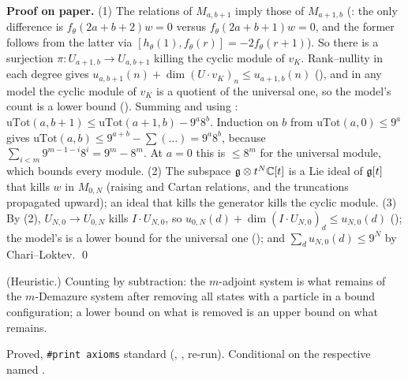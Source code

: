 \textbf{Proof on paper.} (1) The relations of $M_{a,b+1}$ imply those of $M_{a+1,b}$ (: the only
difference is $f_\theta(2a+b+2)w=0$ versus $f_\theta(2a+b+1)w=0$, and the former follows from the latter via
$[h_\theta(1),f_\theta(r)]=-2f_\theta(r+1)$). So there is a surjection $\pi:U_{a+1,b}\to U_{a,b+1}$ killing the cyclic module of
$v_K$. Rank--nullity in each degree gives $u_{a,b+1}(n)+\dim(U\cdot v_K)_n\le u_{a+1,b}(n)$ (), and in any
model the cyclic module of $v_K$ is a quotient of the universal one, so the model's count is a lower bound
(). Summing and using : $\mathrm{uTot}(a,b+1)\le\mathrm{uTot}(a+1,b)-9^a8^b$. Induction on $b$ from
$\mathrm{uTot}(a,0)\le9^a$ gives $\mathrm{uTot}(a,b)\le9^{a+b}-\sum(\dots)=9^a8^b$, because
$\sum_{i<m}9^{m-1-i}8^i=9^m-8^m$. At $a=0$ this is $\le8^m$ for the universal module, which bounds every module.
(2) The subspace $\mathfrak g\otimes t^N{\mathbb{C}}[t]$ is a Lie ideal of $\mathfrak g[t]$ that kills $w$ in $M_{0,N}$ (raising and
Cartan relations, and the truncations propagated upward); an ideal that kills the generator kills the cyclic module.
(3) By (2), $U_{N,0}\to U_{0,N}$ kills $I\cdot U_{N,0}$, so $u_{0,N}(d)+\dim(I\cdot U_{N,0})_d\le u_{N,0}(d)$
(); the model's  is a lower bound for the universal one (); and $\sum_du_{N,0}(d)\le9^N$
by Chari--Loktev. \qed

\begin{physics}
(Heuristic.) Counting by subtraction: the $m$-adjoint system is what remains of the $m$-Demazure system after removing all states with a
particle in a bound configuration; a lower bound on what is removed is an upper bound on what remains.
\end{physics}

\begin{status}
Proved, \texttt{\#print axioms} standard (, ,
 re-run). Conditional on the respective named .
\end{status}

